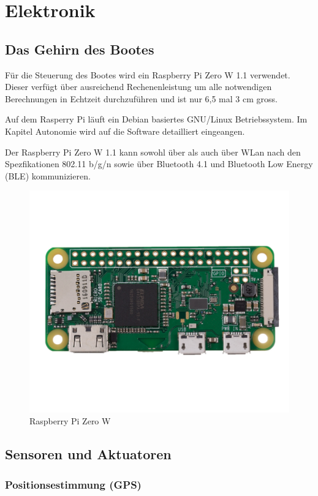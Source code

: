 

\chapter{Elektronik}
\label{chap:elektronik}

\section{Das Gehirn des Bootes}
Für die Steuerung des Bootes wird ein Raspberry Pi Zero W 1.1 verwendet. Dieser verfügt über ausreichend Rechenenleistung um alle notwendigen Berechnungen in Echtzeit durchzuführen und ist nur 6,5 mal 3 cm gross.

Auf dem Rasperry Pi läuft ein Debian basiertes GNU/Linux Betriebssystem. Im Kapitel Autonomie wird auf die Software detailliert eingeangen. 

Der Raspberry Pi Zero W 1.1 kann sowohl über als auch über WLan nach den Spezfikationen 802.11 b/g/n sowie über Bluetooth 4.1 und Bluetooth Low Energy (BLE) kommunizieren.  

\begin{figure}[H]
    \centering
    \includegraphics[width=0.5\linewidth]{assets/raspi Zero.jpg}
    \caption{Raspberry Pi Zero W}
    \label{fig:enter-label}
\end{figure}







\section{Sensoren und Aktuatoren}
\subsection{Positionsestimmung (GPS)}

